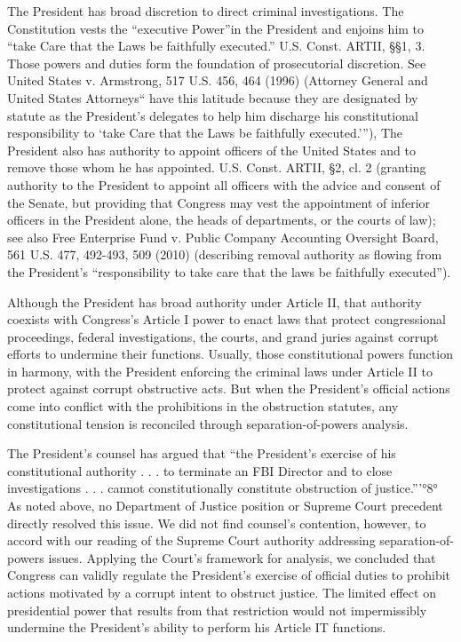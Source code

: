 The President has broad discretion to direct criminal investigations.
The Constitution vests the “executive Power”in the President and enjoins him to “take Care that the Laws be faithfully executed.” U.S. Const. ARTII, \S\S 1, 3.
Those powers and duties form the foundation of prosecutorial discretion.
See United States v. Armstrong, 517 U.S. 456, 464 (1996) (Attorney General and United States Attorneys“ have this latitude because they are designated by statute as the President’s delegates to help him discharge his constitutional responsibility to ‘take Care that the Laws be faithfully executed.’”), The President also has authority to appoint officers of the United States and to remove those whom he has appointed. U.S. Const. ARTII, \S 2, cl. 2 (granting authority to the President to appoint all officers with the advice and consent of the Senate, but providing that Congress may vest the appointment of inferior officers in the President alone, the heads of departments, or the courts of law);
see also Free Enterprise Fund v. Public Company Accounting Oversight Board, 561 U.S. 477, 492-493, 509 (2010) (describing removal authority as flowing from the President’s “responsibility to take care that the laws be faithfully executed”).

Although the President has broad authority under Article II, that authority coexists with Congress’s Article I power to enact laws that protect congressional proceedings, federal investigations, the courts, and grand juries against corrupt efforts to undermine their functions.
Usually, those constitutional powers function in harmony, with the President enforcing the criminal laws under Article II to protect against corrupt obstructive acts.
But when the President’s official actions come into conflict with the prohibitions in the obstruction statutes, any constitutional tension is reconciled through separation-of-powers analysis.

The President’s counsel has argued that “the President’s exercise of his constitutional authority . . . to terminate an FBI Director and to close investigations . . . cannot constitutionally constitute obstruction of justice.”'°8° As noted above, no Department of Justice position or Supreme Court precedent directly resolved this issue.
We did not find counsel’s contention, however, to accord with our reading of the Supreme Court authority addressing separation-of-powers issues.
Applying the Court’s framework for analysis, we concluded that Congress can validly regulate the President’s exercise of official duties to prohibit actions motivated by a corrupt intent to obstruct justice.
The limited effect on presidential power that results from that restriction would not impermissibly undermine the President’s ability to perform his Article IT functions.

